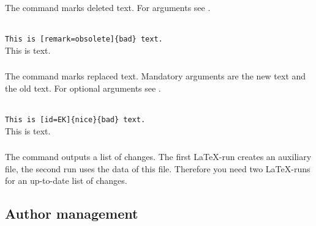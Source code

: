 \subsubsection{}
\DescribeMacro{\deleted}

The command  marks deleted text.
For arguments see .

\begin{chusage}
		\>\\
	\usageexample
		\>\texttt{This is [remark=obsolete]\{bad\} text.}\\
		\>This is  text.
\end{chusage}


\subsubsection{}
\DescribeMacro{\replaced}

The command  marks replaced text.
Mandatory arguments are the new text and the old text.
For optional arguments see .

\begin{chusage}
		\>\\
	\usageexample
		\>\texttt{This is [id=EK]\{nice\}\{bad\} text.}\\
		\>This is  text.
\end{chusage}



\subsubsection{}
\DescribeMacro{\listofchanges}

The command  outputs a list of changes.
The first \LaTeX-run creates an auxiliary file, the second run uses the data of this file.
Therefore you need two \LaTeX-runs for an up-to-date list of changes.




\subsection{Author management}
\label{sec:user:authormanagement}

